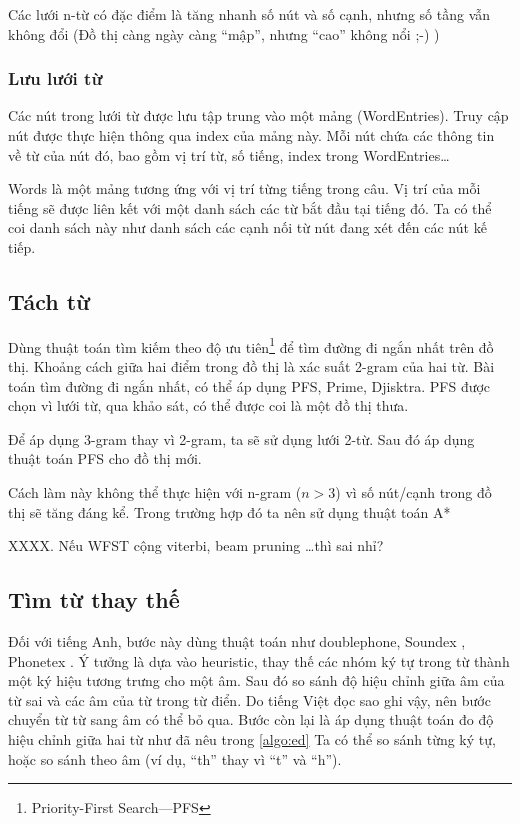 \documentclass[a4paper]{book} %
\begin{document}
Các lưới n-từ có đặc điểm là tăng nhanh số nút và số cạnh, nhưng số
tầng vẫn không đổi (Đồ thị càng ngày càng ``mập'', nhưng ``cao''
không nổi ;-) )


\subsubsection{Lưu lưới từ}

Các nút trong lưới từ được lưu tập trung vào một mảng
(WordEntries). Truy cập nút được thực hiện thông qua index của mảng
này. Mỗi nút chứa các thông tin về từ của nút đó, bao gồm vị trí từ,
số tiếng, index trong WordEntries\ldots{}

Words là một mảng tương ứng với vị trí từng tiếng trong câu. Vị trí
của mỗi tiếng sẽ được liên kết với một danh sách các từ bắt đầu tại
tiếng đó. Ta có thể coi danh sách này như danh sách các cạnh nối từ
nút đang xét đến các nút kế tiếp.


\subsection{Tách từ}
\label{sub:wordseg}

Dùng thuật toán tìm kiếm theo độ ưu tiên\footnote{Priority-First
Search---PFS} để tìm đường đi ngắn nhất trên đồ thị. Khoảng cách giữa hai
điểm trong đồ thị là xác suất 2-gram của hai từ. Bài toán tìm đường
đi ngắn nhất, có thể áp dụng PFS, Prime, Djisktra. PFS được chọn vì
lưới từ, qua khảo sát, có thể được coi là một đồ thị thưa.

Để áp dụng 3-gram thay vì 2-gram, ta sẽ sử dụng lưới 2-từ. Sau đó áp
dụng thuật toán PFS cho đồ thị mới.

Cách làm này không thể thực hiện với n-gram ($n > 3$) vì số nút/cạnh
trong đồ thị sẽ tăng đáng kể. Trong trường hợp đó ta nên sử dụng
thuật toán A*

XXXX. Nếu WFST cộng viterbi, beam pruning \ldots thì sai nhỉ?


\subsection{Tìm từ thay thế}

Đối với tiếng Anh, bước này dùng thuật toán như doublephone, Soundex
\cite{soundex}, Phonetex \cite{phonetex}. Ý tưởng 
là dựa vào heuristic, thay thế các nhóm ký tự trong từ thành một ký
hiệu tương trưng cho một âm. Sau đó so sánh độ hiệu chỉnh giữa âm của
từ sai và các âm của từ trong từ điển. Do tiếng Việt đọc sao ghi vậy,
nên bước chuyển từ từ sang âm có thể bỏ qua. Bước còn lại là áp dụng
thuật toán đo độ hiệu chỉnh giữa hai từ như đã nêu trong \ref{algo:ed}
Ta có thể so sánh từng ký tự, hoặc so sánh theo âm (ví dụ, ``th'' thay
vì ``t'' và ``h'').
\end{document}
